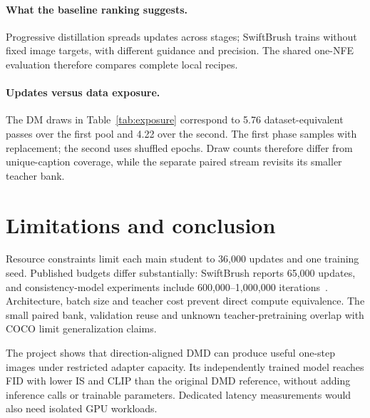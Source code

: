 \documentclass[10pt,twocolumn,letterpaper]{article}
\begin{document}
\paragraph{What the baseline ranking suggests.}

Progressive distillation spreads updates across stages; SwiftBrush trains
without fixed image targets, with different guidance and precision. The
shared one-NFE evaluation therefore compares complete local recipes.

\paragraph{Updates versus data exposure.}
The DM draws in Table~\ref{tab:exposure} correspond to 5.76 dataset-equivalent
passes over the first pool and 4.22 over the second. The first phase samples
with replacement; the second uses shuffled epochs. Draw counts therefore
differ from unique-caption coverage, while the separate paired stream
revisits its smaller teacher bank.

\section{Limitations and conclusion}
Resource constraints limit each main student to 36,000 updates and one
training seed. Published budgets differ substantially: SwiftBrush reports
65,000 updates, and consistency-model experiments include
600,000--1,000,000 iterations~\cite{nguyen2024swiftbrush,song2023consistency}.
Architecture, batch size and teacher cost prevent direct compute equivalence.
The small paired bank, validation reuse and unknown teacher-pretraining
overlap with COCO limit generalization claims.

The project shows that direction-aligned DMD can produce useful one-step
images under restricted adapter capacity. Its independently trained model
reaches FID \ASelectedFID{} with lower IS and CLIP than the original DMD
reference, without adding inference calls or trainable parameters.
\CEControlConclusion{} Dedicated latency measurements
would also need isolated GPU workloads.

\clearpage
{}
\balance
{\small


}
\end{document}
